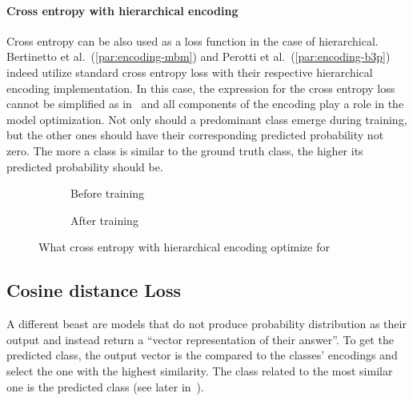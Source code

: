 \paragraph{Cross entropy with hierarchical encoding} Cross entropy can be also
used as a loss function in the case of hierarchical. Bertinetto et
al.~(\ref{par:encoding-mbm}) and Perotti et al.~(\ref{par:encoding-b3p}) indeed
utilize standard cross entropy loss with their respective hierarchical encoding
implementation. In this case, the expression for the cross entropy loss cannot
be simplified as in~ and all
components of the encoding play a role in the model optimization. Not only
should a predominant class emerge during training, but the other ones should
have their corresponding predicted probability not zero. The more a class is
similar to the ground truth class, the higher its predicted probability should
be.
\begin{figure}[htbp]
  \centering
  \begin{subfigure}{0.45\textwidth}
    \centering
    \begin{minipage}{\textwidth}
      \resizebox{\linewidth}{!}{}
    \end{minipage}
    \caption{Before training}
    \label{fig:03/xe-hier-before}
  \end{subfigure}
  \begin{subfigure}{0.45\textwidth}
    \centering
    \begin{minipage}{\textwidth}
      \resizebox{\linewidth}{!}{}
    \end{minipage}
    \caption{After training}
    \label{fig:03/xe-hier-after}
  \end{subfigure}
  \caption{What cross entropy with hierarchical encoding optimize for}
\end{figure}

\subsection{Cosine distance Loss}
\label{subsec:cosine-distance-loss}

A different beast are models that do not produce probability distribution as
their output and instead return a ``vector representation of their answer''. To
get the predicted class, the output vector is the compared to the classes'
encodings and select the one with the highest similarity. The class related to
the most similar one is the predicted class (see later in~).

